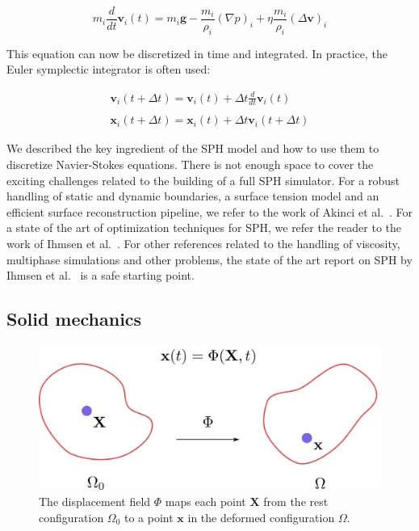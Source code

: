 \begin{equation}
    \displaystyle m_{i}\frac{d}{dt}\mathbf{v}_{i}(t) = m_{i}\mathbf{g} - \frac{m_{i}}{\rho_{i}}(\nabla p)_{i} + \eta\frac{m_{i}}{\rho_{i}}\left(\Delta \mathbf{v}\right)_{i}
\end{equation}

This equation can now be discretized in time and integrated. 
In practice, the Euler symplectic integrator is often used:

\begin{equation}
\begin{array}{ll}
\displaystyle \mathbf{v}_{i}(t+\Delta t) = \mathbf{v}_{i}(t) + \Delta t \frac{d}{dt}\mathbf{v}_{i}(t) \\ \\
\displaystyle \mathbf{x}_{i}(t+\Delta t) = \mathbf{x}_{i}(t) + \Delta t \mathbf{v}_{i}(t+\Delta t)
\end{array}
\end{equation}

We described the key ingredient of the SPH model and how to use them to discretize Navier-Stokes equations. 
There is not enough space to cover the exciting challenges related to the building of a full SPH simulator. 
For a robust handling of static and dynamic boundaries, a surface tension model and an efficient surface reconstruction pipeline, we refer to the work of Akinci et al.~\cite{Akinci2012b, Akinci2013, Akinci2012a}.  
For a state of the art of optimization techniques for SPH, we refer the reader to the work of Ihmsen et al.~\cite{Ihmsen2011:ParallelSPH}. 
For other references related to the handling of viscosity, multiphase simulations and other problems, the state of the art report on SPH by Ihmsen et al.~\cite{Ihmsen2014:STAR} is a safe starting point.

\subsection{Solid mechanics}
\label{subsec:solidMechanics}

\begin{figure}[!ht]
\centering
\includegraphics[scale=0.4]{./images/continuum_mechanics/displacementField.png}
\caption[STAR mechanics: Displacement field]{\label{fig:displacementField}
 The displacement field $\Phi$ maps each point $\mathbf{X}$ from the rest configuration $\Omega_{0}$ to a point $\mathbf{x}$ in the deformed configuration $\Omega$.}
\end{figure}

